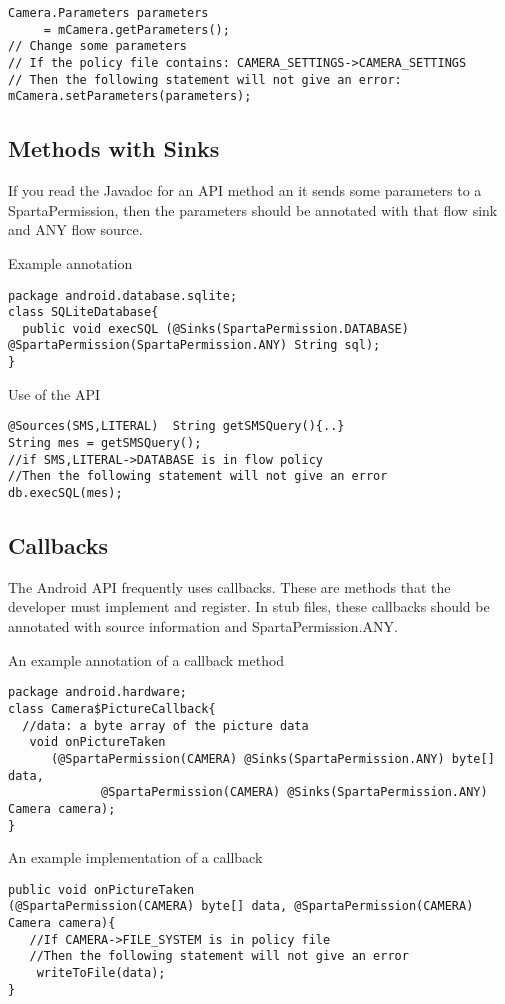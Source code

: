 \begin{Verbatim}
Camera.Parameters parameters
     = mCamera.getParameters();
// Change some parameters
// If the policy file contains: CAMERA_SETTINGS->CAMERA_SETTINGS
// Then the following statement will not give an error:
mCamera.setParameters(parameters);
\end{Verbatim}



\subsection{Methods with Sinks}
If you read the Javadoc for an API method an it sends some parameters to a SpartaPermission, then the parameters
should be annotated with that flow sink and ANY flow source.  

Example annotation
\begin{Verbatim}
package android.database.sqlite;
class SQLiteDatabase{
  public void execSQL (@Sinks(SpartaPermission.DATABASE) @SpartaPermission(SpartaPermission.ANY) String sql);
}
\end{Verbatim}
Use of the API
\begin{Verbatim}
@Sources(SMS,LITERAL)  String getSMSQuery(){..}
String mes = getSMSQuery();
//if SMS,LITERAL->DATABASE is in flow policy
//Then the following statement will not give an error
db.execSQL(mes);
\end{Verbatim}

\subsection{Callbacks}
The Android API frequently uses callbacks.  These are methods that the developer must 
implement and register.  In stub files, these callbacks should be annotated
with source information and SpartaPermission.ANY.  

An example annotation of a callback method
\begin{Verbatim}
package android.hardware;
class Camera$PictureCallback{
  //data: a byte array of the picture data
   void onPictureTaken 
      (@SpartaPermission(CAMERA) @Sinks(SpartaPermission.ANY) byte[] data, 
             @SpartaPermission(CAMERA) @Sinks(SpartaPermission.ANY)  Camera camera);
}
\end{Verbatim}

An example implementation of a callback
\begin{Verbatim}
public void onPictureTaken
(@SpartaPermission(CAMERA) byte[] data, @SpartaPermission(CAMERA) Camera camera){
   //If CAMERA->FILE_SYSTEM is in policy file
   //Then the following statement will not give an error
    writeToFile(data);
}
\end{Verbatim}


